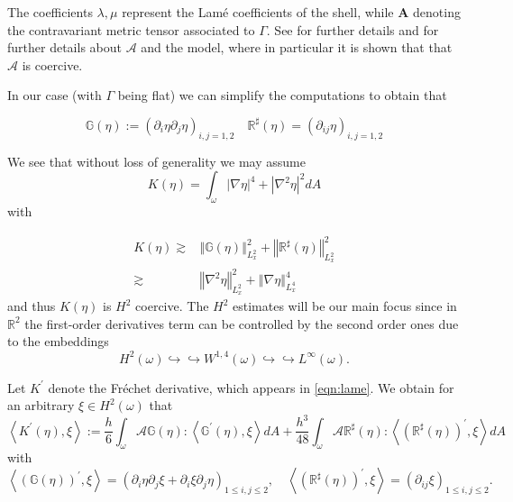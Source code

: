 \documentclass[10pt,a4paper]{article}
\numberwithin{equation}{section}
\begin{document}
The coefficients $\lambda, \mu$ represent the Lam\'{e} coefficients of the shell, while $\mathbf{A}$ denoting the contravariant metric tensor associated to $\Gamma$.
See \cite[p.162]{ciarlet2000theory} for further details  and \cite{ciarlet-roquefort-2001} for further details about $\mathcal{A}$ and the model, where in particular it is shown that that $\mathcal{A}$ is coercive. 

In our case (with $\Gamma$ being flat) we can simplify the computations to obtain that


 \begin{equation}
        \mathbb{G}\left(\eta\right):=\left(\partial_{i}\eta\partial_{j}\eta\right)_{i,j=1,2}\quad\mathbb{R}^{\sharp}\left(\eta\right)=\left(\partial_{ij}\eta\right)_{i,j=1,2}
    \end{equation}
    
 We see that without loss of generality we may assume
 \begin{equation}
     K\left(\eta\right)=\int_{\omega}\left|\nabla\eta\right|^{4}+\left|\nabla^{2}\eta\right|^{2}dA
 \end{equation}
 with

\begin{equation}
\begin{aligned}K\left(\eta\right)\gtrsim & \left\Vert \mathbb{G}\left(\eta\right)\right\Vert _{L_{x}^{2}}^{2}+\left\Vert \mathbb{R}^{\sharp}\left(\eta\right)\right\Vert _{L_{x}^{2}}^{2}\\
\gtrsim & \left\Vert \nabla^{2}\eta\right\Vert _{L_{x}^{2}}^{2}+\left\Vert \nabla\eta\right\Vert _{L_{x}^{4}}^{4}
\end{aligned}
\end{equation}
and  thus $K(\eta)$ is $H^{2}$ coercive.
The $H^{2}$ estimates will be our main focus since in $\mathbb{R}^{2}$  the first-order derivatives term can be controlled by the second order ones due to the embeddings \[H^{2}\left(\omega\right)\hookrightarrow\hookrightarrow W^{1,4}\left(\omega\right)\hookrightarrow\hookrightarrow L^{\infty}\left(\omega\right).
\]

Let $K^{\prime}$ denote the Fr\'{e}chet derivative, which appears in \eqref{eqn:lame}.
We obtain for an arbitrary $\xi \in H^{2}\left(\omega\right)$ that
\[
\left\langle K^{\prime}\left(\eta\right),\xi\right\rangle :=\frac{h}{6}\int_{\omega}\mathcal{A}\mathbb{G}\left(\eta\right):\left\langle \mathbb{G}^{\prime}\left(\eta\right),\xi\right\rangle dA+\frac{h^{3}}{48}\int_{\omega}\mathcal{A}\mathbb{R}^{\sharp}\left(\eta\right):\left\langle \left(\mathbb{R}^{\sharp}\left(\eta\right)\right)^{\prime},\xi\right\rangle dA
\]
with 
\[
\left\langle \left(\mathbb{G}\left(\eta\right)\right)^{\prime},\xi\right\rangle =\left(\partial_{i}\eta\partial_{j}\xi+\partial_{i}\xi\partial_{j}\eta\right)_{1\le i,j\le2},\quad\left\langle \left(\mathbb{R}^{\sharp}\left(\eta\right)\right)^{\prime},\xi\right\rangle =\left(\partial_{ij}\xi\right)_{1\le i,j\le2}.
\]
\end{document}
